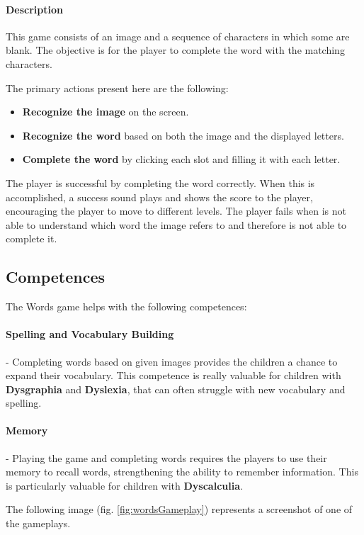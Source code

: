 \paragraph{Description}
This game consists of an image and a sequence of characters in which some are blank. The objective is for the player to complete the word with the matching characters.

The primary actions present here are the following:

\begin{itemize}
    \item \textbf{Recognize the image} on the screen.
    \item \textbf{Recognize the word} based on both the image and the displayed letters.
    \item \textbf{Complete the word} by clicking each slot and filling it with each letter.
\end{itemize}

The player is successful by completing the word correctly. When this is accomplished, a success sound plays and shows the score to the player, encouraging the player to move to different levels.
The player fails when is not able to understand which word the image refers to and therefore is not able to complete it.

\subsection*{Competences}
The Words game helps with the following competences:

\paragraph{Spelling and Vocabulary Building}- Completing words based on given images provides the children a chance to expand their vocabulary. This competence is really valuable for children with \textbf{Dysgraphia} and \textbf{Dyslexia}, that can often struggle with new vocabulary and spelling.

\paragraph{Memory}- Playing the game and completing words requires the players to use their memory to recall words, strengthening the ability to remember information. This is particularly valuable for children with \textbf{Dyscalculia}.

The following image (fig. \ref{fig:wordsGameplay}) represents a screenshot of one of the gameplays.

